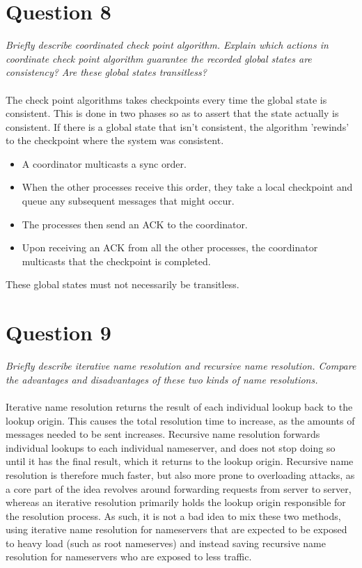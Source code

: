 \documentclass[a4paper, titlepage,12pt]{article}
\begin{document}
	\section*{Question 8}
	\emph{Briefly describe coordinated check point algorithm. Explain which actions in coordinate check point algorithm guarantee the recorded global states are consistency? Are these global states transitless?}
\\\\
	The check point algorithms takes checkpoints every time the global state is consistent. This is done in two phases so as to assert that the state actually is consistent. If there is a global state that isn't consistent, the algorithm 'rewinds' to the checkpoint where the system was consistent.
\begin{itemize}
	\item A coordinator multicasts a sync order.
	\item When the other processes receive this order, they take a local checkpoint and queue any subsequent messages that might occur.
	\item The processes then send an ACK to the coordinator.
	\item Upon receiving an ACK from all the other processes, the coordinator multicasts that the checkpoint is completed.
\end{itemize}
	These global states must not necessarily be transitless.

	\section*{Question 9}
	\emph{Briefly describe iterative name resolution and recursive name resolution. Compare the advantages and disadvantages of these two kinds of name resolutions.}
\\\\
	Iterative name resolution returns the result of each individual lookup back to the lookup origin. This causes the total resolution time to increase, as the amounts of messages needed to be sent increases. Recursive name resolution forwards individual lookups to each individual nameserver, and does not stop doing so until it has the final result, which it returns to the lookup origin. Recursive name resolution is therefore much faster, but also more prone to overloading attacks, as a core part of the idea revolves around forwarding requests from server to server, whereas an iterative resolution primarily holds the lookup origin responsible for the resolution process. As such, it is not a bad idea to mix these two methods, using iterative name resolution for nameservers that are expected to be exposed to heavy load (such as root nameserves) and instead saving recursive name resolution for nameservers who are exposed to less traffic.
\end{document}
